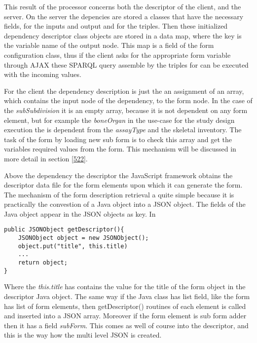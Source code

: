 

This result of the processor concerns both the descriptor of the client, and the server. On the server the depencies are stored a classes that have the necessary fields, for the inputs and output and for the triples. Then these initialized dependency descriptor class objects are stored in a data map, where the key is the variable name of the output node. This map is a field of the form configuration class, thus if the client asks for the appropriate form variable through AJAX these SPARQL query assemble by the triples for can be executed with the incoming values.


For the client the dependency description is just the an assignment of an array, which contains the input node of the dependency, to the form node. In the case of the \textit{subSubdivision} it is an empty array, because it is not dependent on any form element, but for example the \textit{boneOrgan} in the use-case for the study design execution the is dependent from the \textit{assayType} and the skeletal inventory. The task of the form by loading new sub form is to check this array and get the variables required values from the form. This mechanism will be discussed in more detail in section \ref{522}. 

Above the dependency the descriptor the JavaScript framework obtains the descriptor data file for the form elements upon which it can generate the form. The mechanism of the form description retrieval a quite simple because it is practically the convestion of a Java object into a JSON object. The fields of the Java object appear in the JSON objects as key. In 

\begin{lstlisting}[basicstyle=\footnotesize, frame=single, caption={Java to JSON}, captionpos=b, belowskip=1em, aboveskip=2em]
public JSONObject getDescriptor(){
	JSONObject object = new JSONObject();
	object.put("title", this.title)
	... 
	return object;	
}
\end{lstlisting}

Where the \textit{this.title} has contains the value for the title of the form object in the descriptor Java object. The same way if the Java class has list field, like the form has list of form elements, then getDescriptor() routines of each element is called and inserted into a JSON array. Moreover if the form element is sub form adder then it has a field \textit{subForm}. This comes as well of course into the descriptor, and this is the way how the multi level JSON is created.


